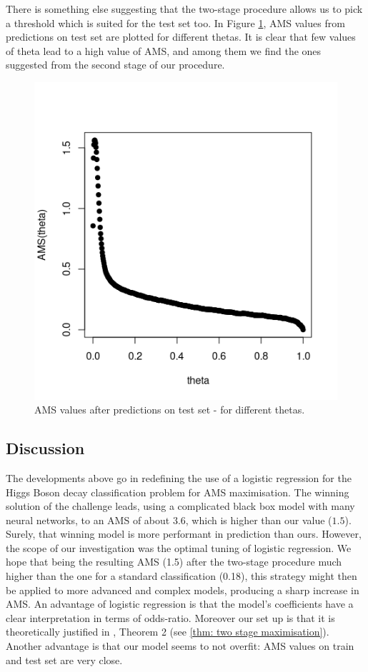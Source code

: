 \documentclass[]{article}
\begin{document}
There is something else suggesting that the two-stage procedure allows us to pick a threshold which is suited for the test set too. In Figure \ref{fig: AMS on test}, AMS values from predictions on test set are plotted for different thetas. It is clear that few values of theta lead to a high value of AMS, and among them we find the ones suggested from the second stage of our procedure. 

\begin{figure}[H]
\centering
\includegraphics[scale=0.7]{../Pictures/testbadpractice.png}
\caption{AMS values after predictions on test set - for different thetas.}
\label{fig: AMS on test}
\end{figure}

\subsection{Discussion}

The developments above go in redefining the use of a logistic regression for the Higgs Boson decay classification problem for AMS maximisation. The winning solution of the challenge leads, using a complicated black box model with many neural networks, to an AMS of about $3.6$, which is higher than our value ($1.5$). Surely, that winning model is more performant in prediction than ours. However, the scope of our investigation was the optimal tuning of logistic regression. We hope that being the resulting AMS (1.5) after the two-stage procedure much higher than the one for a standard classification (0.18), this strategy might then be applied to more advanced and complex models, producing a sharp increase in AMS. An advantage of logistic regression is that the model's coefficients have a clear interpretation in terms of odds-ratio. Moreover our set up is that it is theoretically justified in \cite{kotlowski2014consistent}, Theorem 2 (see \ref{thm: two stage maximisation}). Another advantage is that our model seems to not overfit: AMS values on train and test set are very close.




\end{document}

